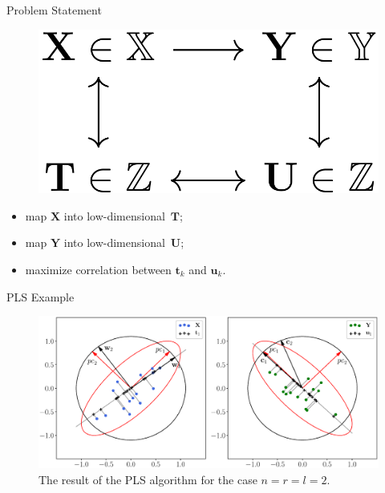 \documentclass[9pt]{beamer}
\newcommand{\bY}{\mathbf{Y}}
\newcommand{\bX}{\mathbf{X}}
\newcommand{\bu}{\mathbf{u}}
\newcommand{\bt}{\mathbf{t}}
\newcommand{\bT}{\mathbf{T}}
\newcommand{\bU}{\mathbf{U}}
\begin{document}
\begin{frame}{Problem Statement}
\begin{minipage}{0.4\linewidth}
	\begin{figure}
		\includegraphics[width=0.6\linewidth]{figs/diagram}
	\end{figure}
	\vspace{1cm}
	\begin{itemize}
		\item map $\bX$ into low-dimensional~$\bT$;
		\item map $\bY$ into low-dimensional~$\bU$;
		\item maximize correlation between $\bt_k$ and $\bu_k$.
	\end{itemize}
\end{minipage}
\end{frame}
\begin{frame}{PLS Example}
	\begin{figure}
		\includegraphics[width=\linewidth]{figs/PLSFigure.eps}
		\caption{The result of the PLS algorithm for the case $n = r = l = 2$.}
	\end{figure}
\end{frame}
\end{document}
